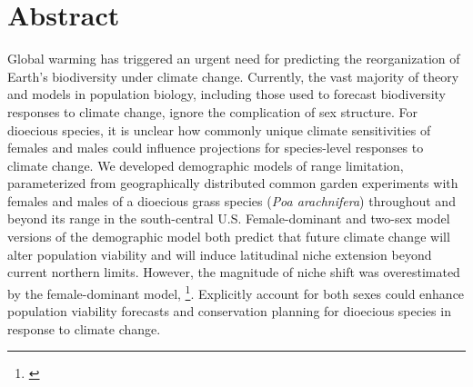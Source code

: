 \documentclass[12pt]{article}\usepackage[]{graphicx}\usepackage[dvipsnames]{xcolor}
\newcommand{\tom}[2]{{\color{red}{#1}}\footnote{\textit{\color{red}{#2}}}}
\begin{document}
\section*{Abstract}
Global warming has triggered an urgent need for predicting the reorganization of Earth's biodiversity under climate change.
Currently, the vast majority of theory and models in population biology, including those used to forecast biodiversity responses to climate change, ignore the complication of sex structure. 
For dioecious species, it is unclear how commonly unique climate sensitivities of females and males could influence projections for species-level responses to climate change. 
We developed demographic models of range limitation, parameterized from geographically distributed common garden experiments with females and males of a dioecious grass species (\textit{Poa arachnifera}) throughout and beyond its range in the south-central U.S. 
Female-dominant and two-sex model versions of the demographic model both predict that future climate change will alter population viability and will induce latitudinal niche extension beyond current northern limits.
However, the magnitude of niche shift was overestimated by the female-dominant model, \tom{because females have broader temperature tolerance than males and become mate-limited under female-biased sex ratios}{Not sure yet if this is true but we need some sort of biological rationale to accompany this result.}.
Explicitly account for both sexes could enhance population viability forecasts and conservation planning for dioecious species in response to climate change.

\newpage
\end{document}
